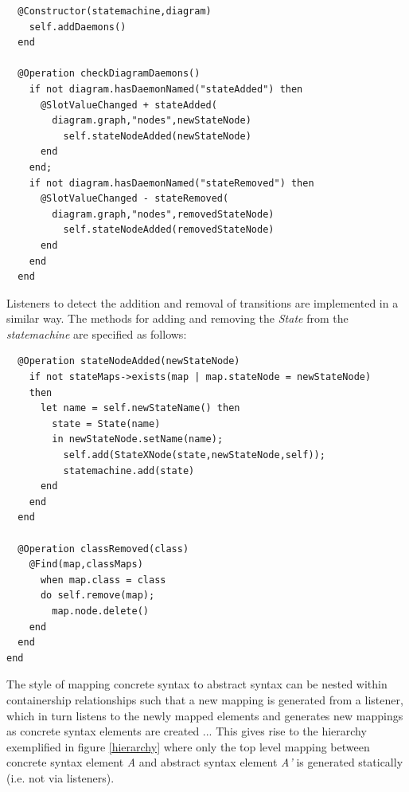 \begin{lstlisting}
  @Constructor(statemachine,diagram)
    self.addDaemons()
  end

  @Operation checkDiagramDaemons()
    if not diagram.hasDaemonNamed("stateAdded") then
      @SlotValueChanged + stateAdded(
        diagram.graph,"nodes",newStateNode)
          self.stateNodeAdded(newStateNode)
      end
    end;
    if not diagram.hasDaemonNamed("stateRemoved") then
      @SlotValueChanged - stateRemoved(
        diagram.graph,"nodes",removedStateNode)
          self.stateNodeAdded(removedStateNode)
      end
    end
  end
\end{lstlisting}
\noindent Listeners to detect the addition and removal of transitions are implemented in a similar way.  The methods for adding and removing the \emph{State} from the \emph{statemachine} are specified as follows:



\begin{lstlisting}
  @Operation stateNodeAdded(newStateNode)
    if not stateMaps->exists(map | map.stateNode = newStateNode)
    then
      let name = self.newStateName() then
        state = State(name)
        in newStateNode.setName(name);
          self.add(StateXNode(state,newStateNode,self));
          statemachine.add(state)
      end
    end
  end

  @Operation classRemoved(class)
    @Find(map,classMaps)
      when map.class = class
      do self.remove(map);
        map.node.delete()
    end
  end
end
\end{lstlisting}
\FloatBarrier

The style of mapping concrete syntax to abstract syntax can be nested  within containership relationships such that a new mapping is generated from a listener, which in turn listens to the newly mapped elements and generates new mappings as concrete syntax elements are created ... This gives rise to the hierarchy exemplified in figure \ref{hierarchy} where only the top level mapping between concrete syntax element \emph{A} and abstract syntax element \emph{A'} is generated statically (i.e. not via listeners).


